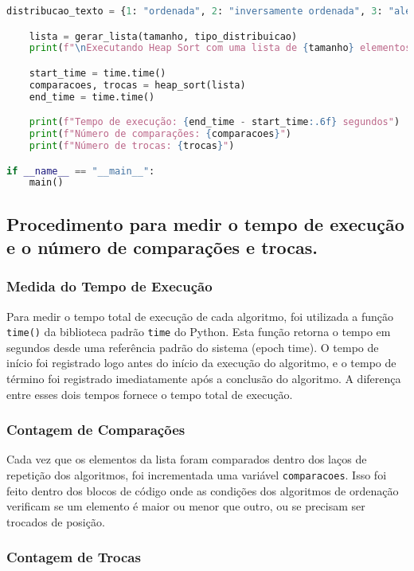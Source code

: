 \documentclass[a4paper,12pt]{article}
\begin{document}
\begin{lstlisting}[language=Python]
    distribucao_texto = {1: "ordenada", 2: "inversamente ordenada", 3: "aleatória"}

    lista = gerar_lista(tamanho, tipo_distribuicao)
    print(f"\nExecutando Heap Sort com uma lista de {tamanho} elementos ({distribucao_texto[tipo_distribuicao]}).\n")

    start_time = time.time()
    comparacoes, trocas = heap_sort(lista)
    end_time = time.time()

    print(f"Tempo de execução: {end_time - start_time:.6f} segundos")
    print(f"Número de comparações: {comparacoes}")
    print(f"Número de trocas: {trocas}")

if __name__ == "__main__":
    main()


\end{lstlisting}

\subsection{Procedimento para medir o tempo de execução e o número de comparações e trocas.}
\subsubsection{Medida do Tempo de Execução}

Para medir o tempo total de execução de cada algoritmo, foi utilizada a função \texttt{time()} da biblioteca padrão \texttt{time} do Python. Esta função retorna o tempo em segundos desde uma referência padrão do sistema (epoch time). O tempo de início foi registrado logo antes do início da execução do algoritmo, e o tempo de término foi registrado imediatamente após a conclusão do algoritmo. A diferença entre esses dois tempos fornece o tempo total de execução.

\subsubsection{Contagem de Comparações}

Cada vez que os elementos da lista foram comparados dentro dos laços de repetição dos algoritmos, foi incrementada uma variável \texttt{comparacoes}. Isso foi feito dentro dos blocos de código onde as condições dos algoritmos de ordenação verificam se um elemento é maior ou menor que outro, ou se precisam ser trocados de posição.

\subsubsection{Contagem de Trocas}
\end{document}
